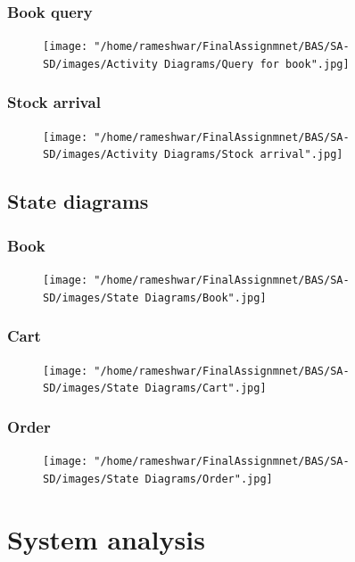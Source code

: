 \documentclass{scrreprt}
\begin{document}
\subsection{Book query}
\begin{figure}[!htb]
  \texttt{[image: "/home/rameshwar/FinalAssignmnet/BAS/SA-SD/images/Activity Diagrams/Query for book".jpg]}
   \label{fig:seqdiagram}
\end{figure}
\clearpage
\subsection{Stock arrival}
\begin{figure}[!htb]
  \texttt{[image: "/home/rameshwar/FinalAssignmnet/BAS/SA-SD/images/Activity Diagrams/Stock arrival".jpg]}
   \label{fig:seqdiagram}
\end{figure}
\clearpage
\section{State diagrams}
\subsection{Book}
\begin{figure}[!htb]
  \texttt{[image: "/home/rameshwar/FinalAssignmnet/BAS/SA-SD/images/State Diagrams/Book".jpg]}
   \label{fig:statediagram}
\end{figure}

\clearpage
\subsection{Cart}
\begin{figure}[!htb]
  \texttt{[image: "/home/rameshwar/FinalAssignmnet/BAS/SA-SD/images/State Diagrams/Cart".jpg]}
   \label{fig:statediagram}
\end{figure}
\clearpage
\subsection{Order}
\begin{figure}[!htb]
  \texttt{[image: "/home/rameshwar/FinalAssignmnet/BAS/SA-SD/images/State Diagrams/Order".jpg]}
   \label{fig:statediagram}
\end{figure}

\chapter{System analysis}
\end{document}
